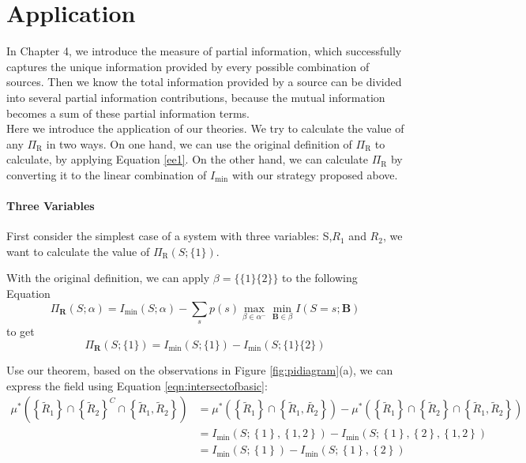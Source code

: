 \section{Application}

In Chapter 4, we introduce the measure of partial information, which successfully captures the unique information provided by every possible combination of sources. Then we know the total information provided by a source can be divided into several partial information contributions, because the mutual information becomes a sum of these partial information terms.\\

Here we introduce the application of our theories. We try to calculate the value of any $\Pi_{\mathrm{R}}$ in two ways. On one hand, we can use the original definition of $\Pi_{\mathrm{R}}$ to calculate, by applying Equation \ref{ee1}. On the other hand, we can calculate $\Pi_{\mathrm{R}}$ by converting it to the linear combination of $I_{\min}$ with our strategy proposed above. 

\paragraph{Three Variables}
First consider the simplest case of a system with three variables: S,${R_1}$ and ${R_2}$, we want to calculate the value of $\Pi_{\mathrm{R}}(S ; \{1\})$.

With the original definition, we can apply $\beta=\{\{1\}\{2\}\}$ to the following Equation \begin{equation}\Pi_{\mathbf{R}}(S ; \alpha)=I_{\min }(S ; \alpha)-\sum_{s} p(s) \max _{\beta \in \alpha^{-}} \min _{\mathbf{B} \in \beta} I(S=s ; \mathbf{B})
\label{ee1}
\end{equation}  to get
\begin{equation}\Pi_{\mathbf{R}}(S ;  \{1\})=I_{\min }(S ; \{1\})-I_{\min }(S ;\{1\}\{2\})\label{ee2}\end{equation}

Use our theorem, based on the observations in Figure \ref{fig:pidiagram}(a), we can express the field using Equation \ref{eqn:intersectofbasic}:
\begin{equation}
\begin{aligned}
    \mu^{*}\left( \left\{ \tilde{R}_1 \right\} \cap \left\{ \tilde{R}_2 \right\}^{C} \cap \left\{\tilde{R}_1, \tilde{R}_2 \right\} \right) &= \mu^{*}\left(\left\{\tilde{R}_1 \right\}\cap  \left\{  \tilde{R}_1, \tilde{R_2} \right \} \right)  -\mu^{*}\left( \left\{\tilde{R}_1\right\}\cap \left\{ \tilde{R}_2 \right\}\cap \left\{\tilde{R}_1, \tilde{R}_2 \right\}\right) \\
    &=I_{\min} \left( S; \left\{ 1 \right\} ,\left\{ 1, 2 \right\} \right)  - I_{\min} \left( S; \left\{1 \right\}, \left\{2 \right\},\left\{ 1, 2 \right\} \right) \\&=I_{\min} \left( S; \left\{ 1 \right\}  \right)  - I_{\min} \left( S; \left\{1 \right\}, \left\{2 \right\} \right)
\end{aligned}
\label{ss}
\end{equation}

